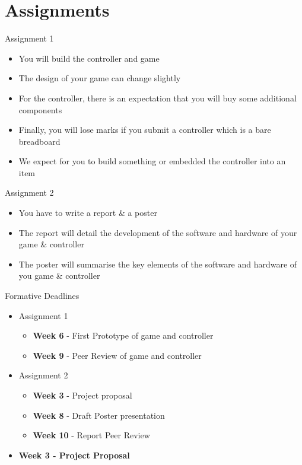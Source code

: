 \part{Assignments}
\frame{\partpage}


\begin{frame}{Assignment 1}
\begin{itemize}
	\item You will build the controller and game
	\pause \item The design of your game can change slightly
	\pause \item For the controller, there is an expectation that you will buy some additional components
	\pause \item Finally, you will lose marks if you submit a controller which is a bare breadboard
	\pause \item We expect for you to build something or embedded the controller into an item
\end{itemize}
\end{frame}

\begin{frame}{Assignment 2}
	\begin{itemize}
		\item You have to write a report \& a poster
		\pause \item The report will detail the development of the software and hardware of your game \& controller
		\pause \item The poster will summarise the key elements of the software and hardware of you game \& controller  
	\end{itemize}
\end{frame}

\begin{frame}{Formative Deadlines}
	\begin{itemize}
		\item Assignment 1
		\begin{itemize}
			\pause \item \textbf{Week 6} - First Prototype of game and controller
			\pause \item \textbf{Week 9} - Peer Review of game and controller  
		\end{itemize}
		\pause \item Assignment 2
		\begin{itemize}
			\pause \item \textbf{Week 3} - Project proposal
			\pause \item \textbf{Week 8} - Draft Poster presentation
			\pause \item \textbf{Week 10} - Report Peer Review
		\end{itemize} 
		\pause \item \textbf{Week 3 - Project Proposal}
	\end{itemize}
\end{frame}

